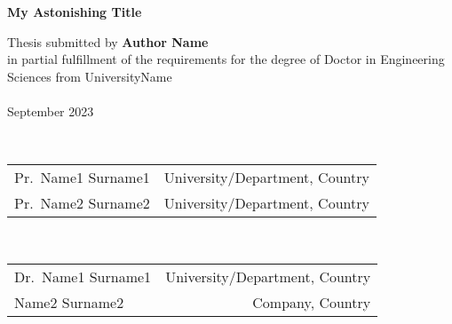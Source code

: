 \thispagestyle{empty}

\begingroup
\vspace{3cm}
\begin{center}
{\sffamily\bfseries\Huge My Astonishing Title}\\
\end{center}

\vspace{2cm}
\begin{flushleft}
    \begin{minipage}{0.7\linewidth}
        {\Large Thesis submitted by {\sffamily\bfseries Author Name} \\
        {in partial fulfillment of the requirements for
        the degree
        of Doctor in Engineering Sciences from UniversityName}\\
        \vspace*{0.5cm}}\\
        {\noindent \sffamily September 2023}
    \end{minipage}
\end{flushleft}

\vspace{2cm}
\begin{flushright}
    \begin{minipage}{\linewidth}
        \\
        \begin{tabular}{lr}
            Pr.~Name1 {\sffamily Surname1} & University/Department, Country\\
            Pr.~Name2 {\sffamily Surname2} & University/Department, Country\\
        \end{tabular}
    \end{minipage}
\end{flushright}

\vspace{0.5cm}
\begin{flushright}
    \begin{minipage}{\linewidth}
        \\
        \begin{tabular}{lr}
            Dr.~Name1 {\sffamily Surname1} & University/Department, Country\\
            Name2 {\sffamily Surname2} & Company, Country\\
        \end{tabular}
    \end{minipage}
\end{flushright}

